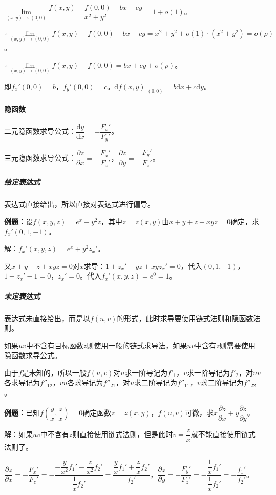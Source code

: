 \documentclass[UTF8, 12pt]{ctexart}
\begin{document}
$\lim\limits_{(x,y)\to(0,0)}\dfrac{f(x,y)-f(0,0)-bx-cy}{x^2+y^2}=1+o(1)$。

$\therefore\lim\limits_{(x,y)\to(0,0)}f(x,y)-f(0,0)-bx-cy=x^2+y^2+o(1)\cdot(x^2+y^2)=o(\rho)$。

$\therefore\lim\limits_{(x,y)\to(0,0)}f(x,y)-f(0,0)=bx+cy+o(\rho)$。

即$f_x'(0,0)=b$，$f_y'(0,0)=c$。$\textrm{d}f(x,y)|_{(0,0)}=b\textrm{d}x+c\textrm{d}y$。

\paragraph{隐函数} \leavevmode \medskip

二元隐函数求导公式：$\dfrac{\textrm{d}y}{\textrm{d}x}=-\dfrac{F_x'}{F_y'}$。

三元隐函数求导公式：$\dfrac{\partial z}{\partial x}=-\dfrac{F_x'}{F_z'}$，$\dfrac{\partial z}{\partial y}=-\dfrac{F_y'}{F_z'}$。

\subparagraph{给定表达式} \leavevmode \medskip

表达式直接给出，所以直接对表达式进行偏导。

\textbf{例题：}设$f(x,y,z)=e^x+y^2z$，其中$z=z(x,y)$由$x+y+z+xyz=0$确定，求$f_x'(0,1,-1)$。

解：$f_x'(x,y,z)=e^x+y^2z_x'$。

又$x+y+z+xyz=0$对$x$求导：$1+z_x'+yz+xyz_x'=0$，代入$(0,1,-1)$，$1+z_x'-1=0$，$z_x'=0$。代入$f_x'(x,y,z)=e^0=1$。

\subparagraph{未定表达式} \leavevmode \medskip

表达式未直接给出，而是以$f(u,v)$的形式，此时求导要使用链式法则和隐函数法则。

如果$uv$中不含有目标函数$z$则使用一般的链式求导法，如果$uv$中含有$z$则需要使用隐函数求导公式。

由于$f$是未知的，所以一般$f(u,v)$对$u$求一阶导记为$f'_1$，$v$求一阶导记为$f'_2$，对$uv$各求导记为$f''_{12}$，$vu$各求导记为$f''_{21}$，对$u$求二阶导记为$f''_{11}$，$v$求二阶导记为$f''_{22}$。

\textbf{例题：}已知$f\left(\dfrac{y}{x},\dfrac{z}{x}\right)=0$确定函数$z=z(x,y)$，$f(u,v)$可微，求$x\dfrac{\partial z}{\partial x}+y\dfrac{\partial z}{\partial y}$。

解：如果$uv$中不含有$z$则直接使用链式法则，但是此时$v=\dfrac{z}{x}$就不能直接使用链式法则了。

$\dfrac{\partial z}{\partial x}=-\dfrac{F_x'}{F_z'}=-\dfrac{-\dfrac{y}{x^2}f_1'-\dfrac{z}{x^2}f_2'}{\dfrac{1}{x}f_2'}=\dfrac{\dfrac{y}{x}f_1'+\dfrac{z}{x}f_2'}{f_2'}$，$\dfrac{\partial z}{\partial y}=-\dfrac{F_y'}{F_z'}=-\dfrac{\dfrac{1}{x}f_1'}{\dfrac{1}{x}f_2'}=-\dfrac{f_1'}{f_2'}$。
\end{document}
